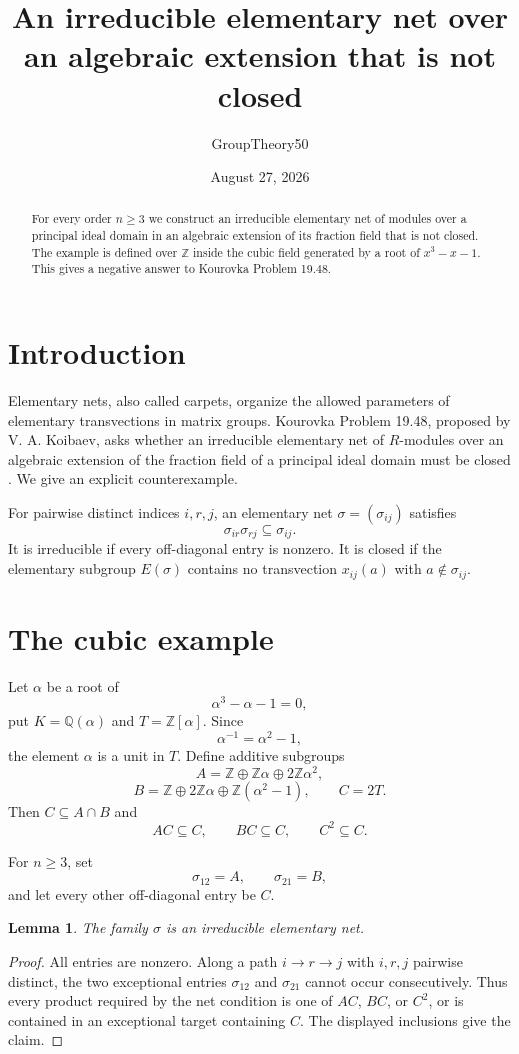 \documentclass[11pt]{amsart}
\title{An irreducible elementary net over an algebraic extension that is not closed}
\author{GroupTheory50}
\date{August 27, 2026}
\newtheorem{lemma}[theorem]{Lemma}
\theoremstyle{definition}
\newcommand{\Z}{\mathbb Z}
\newcommand{\Q}{\mathbb Q}
\begin{document}
\begin{abstract}
For every order $n\geq3$ we construct an irreducible elementary net of modules over a principal ideal domain in an algebraic extension of its fraction field that is not closed.  The example is defined over $\mathbb Z$ inside the cubic field generated by a root of $x^3-x-1$.  This gives a negative answer to Kourovka Problem 19.48.
\end{abstract}
\maketitle

\section{Introduction}
Elementary nets, also called carpets, organize the allowed parameters of elementary transvections in matrix groups.  Kourovka Problem 19.48, proposed by V. A. Koibaev, asks whether an irreducible elementary net of $R$-modules over an algebraic extension of the fraction field of a principal ideal domain must be closed \cite{kourovka}.  We give an explicit counterexample.

For pairwise distinct indices $i,r,j$, an elementary net $\sigma=(\sigma_{ij})$ satisfies
\[
 \sigma_{ir}\sigma_{rj}\subseteq\sigma_{ij}.
\]
It is irreducible if every off-diagonal entry is nonzero.  It is closed if the elementary subgroup $E(\sigma)$ contains no transvection $x_{ij}(a)$ with $a\notin\sigma_{ij}$.

\section{The cubic example}
Let $\alpha$ be a root of
\[
 \alpha^3-\alpha-1=0,
\]
put $K=\Q(\alpha)$ and $T=\Z[\alpha]$.  Since
\[
 \alpha^{-1}=\alpha^2-1,
\]
the element $\alpha$ is a unit in $T$.  Define additive subgroups
\[
 A=\Z\oplus\Z\alpha\oplus2\Z\alpha^2,
\]
\[
 B=\Z\oplus2\Z\alpha\oplus\Z(\alpha^2-1),
 \qquad C=2T.
\]
Then $C\subseteq A\cap B$ and
\[
 AC\subseteq C,\qquad BC\subseteq C,\qquad C^2\subseteq C.
\]

For $n\geq3$, set
\[
 \sigma_{12}=A,\qquad \sigma_{21}=B,
\]
and let every other off-diagonal entry be $C$.

\begin{lemma}\label{lem:elementary-net}
The family $\sigma$ is an irreducible elementary net.
\end{lemma}
\begin{proof}
All entries are nonzero.  Along a path $i\to r\to j$ with $i,r,j$ pairwise distinct, the two exceptional entries $\sigma_{12}$ and $\sigma_{21}$ cannot occur consecutively.  Thus every product required by the net condition is one of $AC$, $BC$, or $C^2$, or is contained in an exceptional target containing $C$.  The displayed inclusions give the claim.
\end{proof}
\end{document}
